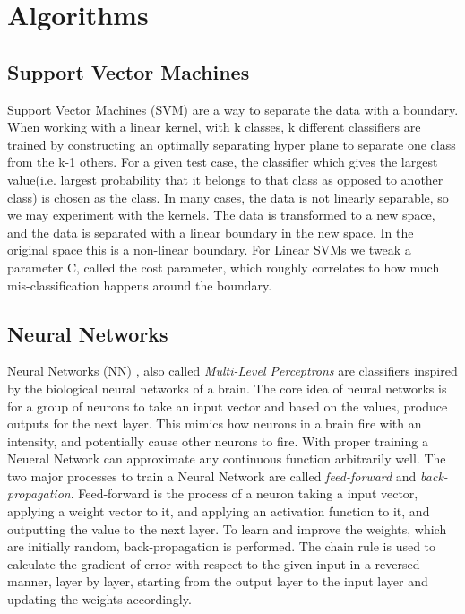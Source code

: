 \documentclass[twoside,twocolumn]{article}
\begin{document}

\section{Algorithms}

\subsection{Support Vector Machines}
Support Vector Machines (SVM) \cite{StatBook} are a way to separate the data with a boundary. When working with a linear kernel, with k classes, k different classifiers are trained by constructing an optimally separating hyper plane to separate one class from the k-1 others. For a given test case, the classifier which gives the largest value(i.e. largest probability that it belongs to that class as opposed to another class) is chosen as the class. In many cases, the data is not linearly separable, so we may experiment with the kernels. The data is transformed to a new space, and the data is separated with a linear boundary in the new space. In the original space this is a non-linear boundary. For Linear SVMs we tweak a parameter C, called the cost parameter, which roughly correlates to how much mis-classification happens around the boundary.
\subsection{Neural Networks}
Neural Networks (NN) \cite{NN}, also called \textit{Multi-Level Perceptrons} are classifiers inspired by the biological neural networks of a brain. The core idea of neural networks is for a group of neurons to take an input vector and based on the values, produce outputs for the next layer. This mimics how neurons in a brain fire with an intensity, and potentially cause other neurons to fire. With proper training a Neueral Network can approximate any continuous function arbitrarily well. The two major processes to train a Neural Network are called \textit{feed-forward} and \textit{back-propagation}. Feed-forward is the process of a neuron taking a input vector, applying a weight vector to it, and applying an activation function to it, and outputting the value to the next layer. To learn and improve the weights, which are initially random, back-propagation is performed. The chain rule is used to calculate the gradient of error with respect to the given input in a reversed manner, layer by layer, starting from the output layer to the input layer and updating the weights accordingly.
\end{document}
